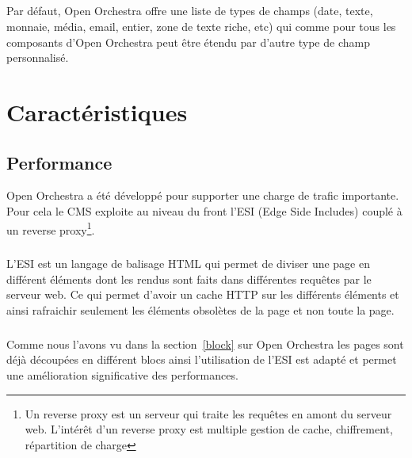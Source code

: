           \paragraph{}
          Par défaut, Open Orchestra offre une liste de types de champs (date, texte, monnaie, média, email, entier, zone de texte riche, etc) qui comme pour tous les composants d'Open Orchestra peut être étendu par d'autre type de champ personnalisé. 
\chapter{Caractéristiques}
   \section{Performance}
   Open Orchestra a été développé pour supporter une charge de trafic importante. Pour cela le CMS exploite au niveau du front l'ESI (Edge Side Includes) couplé à un reverse proxy\footnote{Un reverse proxy est un serveur qui traite les requêtes en amont du serveur web. L'intérêt d'un reverse proxy est multiple gestion de cache, chiffrement, répartition de charge}.
   \paragraph{}
   L'ESI est un langage de balisage HTML qui permet de diviser une page en différent éléments dont les rendus sont faits dans différentes requêtes par le serveur web. Ce qui permet d'avoir un cache HTTP sur les différents éléments et ainsi rafraichir seulement les éléments obsolètes de la page et non toute la page.
   \paragraph{}
   Comme nous l'avons vu dans la section~\ref{block} sur Open Orchestra les pages sont déjà découpées en différent blocs ainsi l'utilisation de l'ESI est adapté et permet une amélioration significative des performances.

